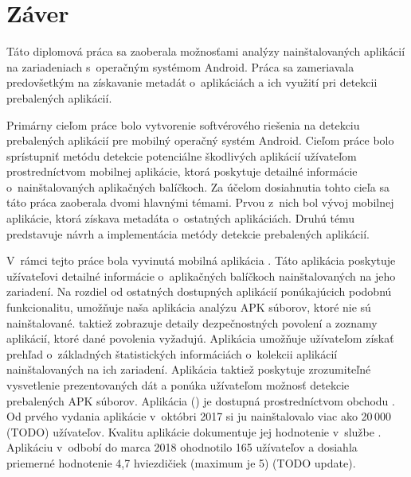 \chapter*{Záver}
Táto diplomová práca sa zaoberala možnosťami analýzy nainštalovaných aplikácií na zariadeniach s~operačným systémom Android. Práca sa zameriavala predovšetkým na získavanie metadát o~aplikáciách a ich využití pri detekcii prebalených aplikácií.

Primárny cieľom práce bolo vytvorenie softvérového riešenia na detekciu prebalených aplikácií pre mobilný operačný systém Android. Cieľom práce bolo sprístupniť metódu detekcie potenciálne škodlivých aplikácií užívateľom prostredníctvom mobilnej aplikácie, ktorá poskytuje detailné informácie o~nainštalovaných aplikačných balíčkoch.  
Za účelom dosiahnutia tohto cieľa sa táto práca zaoberala dvomi hlavnými témami. Prvou z~nich bol vývoj mobilnej aplikácie, ktorá získava metadáta o~ostatných aplikáciách. Druhú tému predstavuje návrh a implementácia metódy detekcie prebalených aplikácií. 

V~rámci tejto práce bola vyvinutá mobilná aplikácia . Táto aplikácia poskytuje užívateľovi detailné informácie o~aplikačných balíčkoch nainštalovaných na jeho zariadení. Na rozdiel od ostatných dostupných aplikácií ponúkajúcich podobnú funkcionalitu, umožňuje naša aplikácia analýzu APK súborov, ktoré nie sú nainštalované. taktiež zobrazuje detaily dezpečnostných povolení a zoznamy aplikácií, ktoré dané povolenia vyžadujú. Aplikácia umožňuje užívateľom získať prehľad o~základných štatistických informáciách o~kolekcii aplikácií nainštalovaných na ich zariadení. Aplikácia taktiež poskytuje zrozumiteľné vysvetlenie prezentovaných dát a ponúka užívateľom možnosť detekcie prebalených APK súborov.  Aplikácia  () je dostupná prostredníctvom obchodu . Od prvého vydania aplikácie v~októbri 2017 si ju nainštalovalo viac ako 20\,000 (TODO) užívateľov. Kvalitu aplikácie dokumentuje jej hodnotenie v~službe . Aplikáciu v~odbobí do marca 2018 ohodnotilo 165 užívateľov a dosiahla priemerné hodnotenie 4,7 hviezdičiek (maximum je 5) (TODO update).

